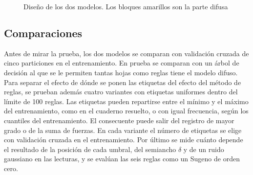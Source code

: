 \documentclass[11pt,letterpaper]{article}
\begin{document}
\begin{figure}[!htb]
    \centering
    \caption{Diseño de los dos modelos. Los bloques amarillos son la parte difusa}
    \label{fig:flujo}
\end{figure}

\subsection{Comparaciones}

Antes de mirar la prueba, los dos modelos se comparan con validación cruzada de cinco particiones en el entrenamiento. En prueba se comparan con un árbol de decisión al que se le permiten tantas hojas como reglas tiene el modelo difuso. Para separar el efecto de dónde se ponen las etiquetas del efecto del método de reglas, se prueban además cuatro variantes con etiquetas uniformes dentro del límite de 100 reglas. Las etiquetas pueden repartirse entre el mínimo y el máximo del entrenamiento, como en el cuaderno resuelto, o con igual frecuencia, según los cuantiles del entrenamiento. El consecuente puede salir del registro de mayor grado o de la suma de fuerzas. En cada variante el número de etiquetas se elige con validación cruzada en el entrenamiento. Por último se mide cuánto depende el resultado de la posición de cada umbral, del semiancho $\delta$ y de un ruido gaussiano en las lecturas, y se evalúan las seis reglas como un Sugeno de orden cero.
\end{document}
